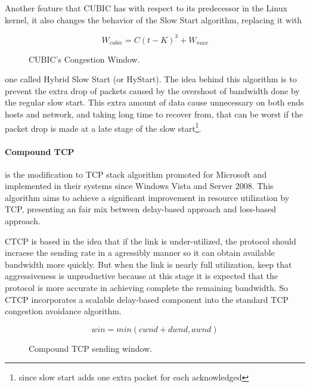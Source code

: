 Another feature that CUBIC has with respect to its predecessor in the Linux
kernel, it also changes the behavior of the Slow Start algorithm, replacing it
with

\begin{figure}[ht]
\begin{minipage}{6cm}
\centering
	\[ W_{cubic} = C(t - K)^3 + W_{max}\]
    \caption{CUBIC's Congestion Window.\protect\footnotemark}
    \label{fig:cubicform}
\end{minipage}%
\end{figure}%


\noindent  one called Hybrid Slow Start (or HyStart)\cite{HaElephants}. 
The idea behind this algorithm is to prevent the extra drop of packets caused by the
overshoot of bandwidth done by the regular slow start. This extra amount of
data cause unnecessary on both ends hosts and network, and taking long time to
recover from, that can be worst if the packet drop is made at a late stage of
the slow start\footnote{since slow start adds one extra packet for each
acknowledged}.

\paragraph{Compound TCP} is the modification to TCP stack algorithm promoted
for Microsoft and implemented in their systems since Windows Vista and Server
2008. This algorithm aims to achieve a significant improvement in resource
utilization by TCP, presenting an fair mix between delay-based approach and
loss-based approach.

CTCP is based in the idea that if the link is under-utilized, the protocol
should incraese the sending rate in a agressibly manner so it can obtain
available bandwidth more quickly. But when the link is nearly full
utilization, keep that aggressiveness is unproductive because at this stage it
is expected that the protocol is more accurate in achieving complete the
remaining bandwidth. So CTCP incorporates a scalable delay-based component
into the standard TCP congestion avoidance algorithm\cite{4146841}.

\begin{figure}
  \begin{center}
    \[ win = min(cwnd + dwnd, awnd)\]
  \end{center}
  \caption{Compound TCP sending window.\protect\footnotemark}
  \label{fig:ctcpform}
\end{figure}

